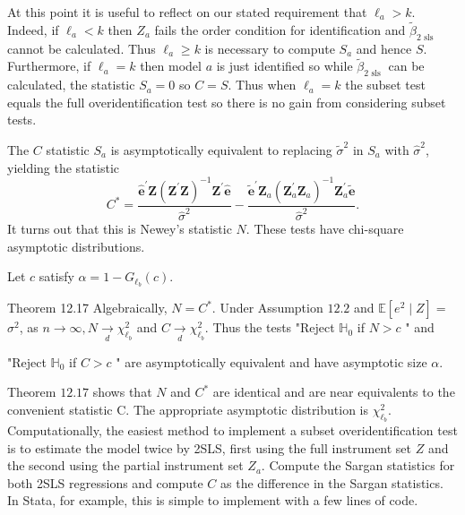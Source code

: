 \documentclass[10pt]{article}
\begin{document}
At this point it is useful to reflect on our stated requirement that $\ell_{a}>k$. Indeed, if $\ell_{a}<k$ then $Z_{a}$ fails the order condition for identification and $\widetilde{\beta}_{2 \text { sls }}$ cannot be calculated. Thus $\ell_{a} \geq k$ is necessary to compute $S_{a}$ and hence $S$. Furthermore, if $\ell_{a}=k$ then model $a$ is just identified so while $\widetilde{\beta}_{2 \text { sls }}$ can be calculated, the statistic $S_{a}=0$ so $C=S$. Thus when $\ell_{a}=k$ the subset test equals the full overidentification test so there is no gain from considering subset tests.

The $C$ statistic $S_{a}$ is asymptotically equivalent to replacing $\widetilde{\sigma}^{2}$ in $S_{a}$ with $\widehat{\sigma}^{2}$, yielding the statistic
$$
C^{*}=\frac{\widehat{\boldsymbol{e}}^{\prime} \boldsymbol{Z}\left(\boldsymbol{Z}^{\prime} \boldsymbol{Z}\right)^{-1} \boldsymbol{Z}^{\prime} \widehat{\boldsymbol{e}}}{\widehat{\sigma}^{2}}-\frac{\widetilde{\boldsymbol{e}}^{\prime} \boldsymbol{Z}_{a}\left(\boldsymbol{Z}_{a}^{\prime} \boldsymbol{Z}_{a}\right)^{-1} \boldsymbol{Z}_{a}^{\prime} \widetilde{\boldsymbol{e}}}{\widehat{\sigma}^{2}} .
$$
It turns out that this is Newey's statistic $N$. These tests have chi-square asymptotic distributions.

Let $c$ satisfy $\alpha=1-G_{\ell_{b}}(c)$.

Theorem 12.17 Algebraically, $N=C^{*}$. Under Assumption $12.2$ and $\mathbb{E}\left[e^{2} \mid Z\right]=$ $\sigma^{2}$, as $n \rightarrow \infty, N \underset{d}{\longrightarrow} \chi_{\ell_{b}}^{2}$ and $C \underset{d}{\longrightarrow} \chi_{\ell_{b}}^{2}$. Thus the tests "Reject $\mathbb{H}_{0}$ if $N>c$ " and

"Reject $\mathbb{H}_{0}$ if $C>c$ " are asymptotically equivalent and have asymptotic size $\alpha$.

Theorem $12.17$ shows that $N$ and $C^{*}$ are identical and are near equivalents to the convenient statistic C. The appropriate asymptotic distribution is $\chi_{\ell_{b}}^{2}$. Computationally, the easiest method to implement a subset overidentification test is to estimate the model twice by 2SLS, first using the full instrument set $Z$ and the second using the partial instrument set $Z_{a}$. Compute the Sargan statistics for both 2SLS regressions and compute $C$ as the difference in the Sargan statistics. In Stata, for example, this is simple to implement with a few lines of code.
\end{document}
